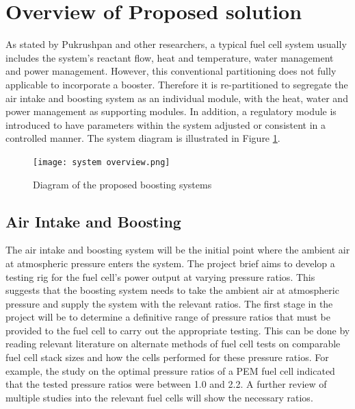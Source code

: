 \documentclass[a4paper,11pt]{article}
\begin{document}
\section{Overview of Proposed solution}
As stated by Pukrushpan \cite{pukrushpan2004control} and other researchers, a typical fuel cell system usually includes the system’s reactant flow, heat and temperature, water management and power management.
However, this conventional partitioning does not fully applicable to incorporate a booster. Therefore it is re-partitioned to segregate the air intake and boosting system as an individual module, with the heat, water and power management as supporting modules. In addition, a regulatory module is introduced to have parameters within the system adjusted or consistent in a controlled manner. The system diagram is illustrated in Figure \ref{fig:systemOverview}.

\begin{figure}[h] 
    \texttt{[image: system overview.png]}
    \caption{Diagram of the proposed boosting systems}
    \centering  
    \label{fig:systemOverview}
\end{figure}

\subsection{Air Intake and Boosting}
The air intake and boosting system will be the initial point where the ambient air at atmospheric pressure enters the system. The project brief aims to develop a testing rig for the fuel cell's power output at varying pressure ratios. This suggests that the boosting system needs to take the ambient air at atmospheric pressure and supply the system with the relevant ratios. The first stage in the project will be to determine a definitive range of pressure ratios that must be provided to the fuel cell to carry out the appropriate testing. This can be done by reading relevant literature on alternate methods of fuel cell tests on comparable fuel cell stack sizes and how the cells performed for these pressure ratios. For example, the study on the optimal pressure ratios of a PEM fuel cell\cite{hoeflinger2020air} indicated that the tested pressure ratios were between 1.0 and 2.2. A further review of multiple studies into the relevant fuel cells will show the necessary ratios.
\end{document}
